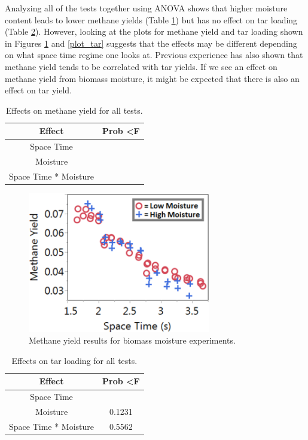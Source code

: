 \documentclass[11pt,twocolumn]{article}
\begin{document}
Analyzing all of the tests together using ANOVA shows that higher moisture content leads to lower methane yields (Table \ref{ch4}) but has no effect on tar loading (Table \ref{tar}).  However, looking at the plots for methane yield and tar loading shown in Figures \ref{plot_ch4} and \ref{plot_tar} suggests that the effects may be different depending on what space time regime one looks at.  Previous experience has also shown that methane yield tends to be correlated with tar yields.  If we see an effect on methane yield from biomass moisture, it might be expected that there is also an effect on tar yield.

\begin{table}
	\centering
	\caption{Effects on methane yield for all tests.}
	\label{ch4}
	\begin{tabular}{c c}
	\toprule
	Effect				&	Prob \textless F	\\
	\midrule
	Space Time			&	\color{red}{\textless 0.0001} \\
	Moisture				&	\color{red}{0.0014} \\
	Space Time * Moisture	&	\color{red}{0.0061} \\
	\midrule
	\end{tabular}
\end{table}

\begin{figure}
	\centering
	\includegraphics[width = 8cm]{ch4.png}
	\caption{Methane yield results for biomass moisture experiments.}
	\label{plot_ch4}
\end{figure}

\begin{table}
	\centering
	\caption{Effects on tar loading for all tests.}
	\label{tar}
	\begin{tabular}{c c}
	\toprule
	Effect				&	Prob \textless F	\\
	\midrule
	Space Time			&	\color{red}{\textless 0.0001} \\
	Moisture				&	0.1231 \\
	Space Time * Moisture	&	0.5562 \\
	\bottomrule
	\end{tabular}
\end{table}
\end{document}
